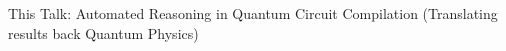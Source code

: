 \begin{frame}{This Talk: Automated Reasoning in Quantum Circuit Compilation}
\pause
\centering
\alert{(Translating results back Quantum Physics)}
\end{frame}




%
%


%
%
%
%
%
%
%
%
%
%
%
%
%
%	


